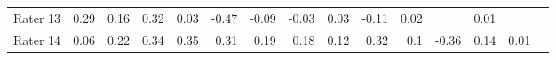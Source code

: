 \begin{tabular}{l|rrrrrrrrrrrrrl}
Rater 13 & \cellcolor[rgb]{ .882,  .914,  .965}0.29 & \cellcolor[rgb]{ .984,  .976,  .988}0.16 & \cellcolor[rgb]{ .855,  .894,  .953}0.32 & \cellcolor[rgb]{ .984,  .859,  .871}0.03 & \cellcolor[rgb]{ .973,  .412,  .42}-0.47 & \cellcolor[rgb]{ .98,  .753,  .761}-0.09 & \cellcolor[rgb]{ .98,  .808,  .816}-0.03 & \cellcolor[rgb]{ .984,  .859,  .871}0.03 & \cellcolor[rgb]{ .98,  .733,  .745}-0.11 & \cellcolor[rgb]{ .984,  .851,  .863}0.02 & \multicolumn{1}{l}{} & \cellcolor[rgb]{ .984,  .843,  .855}0.01 & \multicolumn{1}{l}{} &  \\
Rater 14 & \cellcolor[rgb]{ .984,  .886,  .898}0.06 & \cellcolor[rgb]{ .945,  .957,  .984}0.22 & \cellcolor[rgb]{ .835,  .882,  .949}0.34 & \cellcolor[rgb]{ .827,  .875,  .945}0.35 & \cellcolor[rgb]{ .863,  .902,  .957}0.31 & \cellcolor[rgb]{ .973,  .976,  .996}0.19 & \cellcolor[rgb]{ .98,  .984,  1}0.18 & \cellcolor[rgb]{ .984,  .941,  .953}0.12 & \cellcolor[rgb]{ .855,  .894,  .953}0.32 & \cellcolor[rgb]{ .984,  .922,  .933}0.1 & \cellcolor[rgb]{ .973,  .51,  .518}-0.36 & \cellcolor[rgb]{ .984,  .961,  .973}0.14 & \cellcolor[rgb]{ .984,  .843,  .855}0.01 &  \\
\bottomrule
\bottomrule
\end{tabular}%
